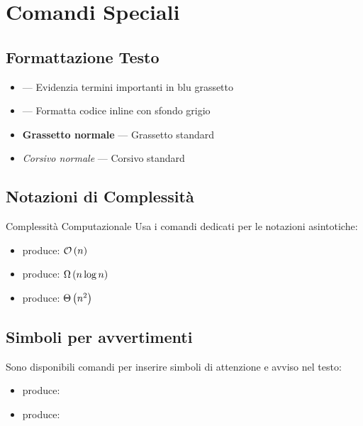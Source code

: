 \documentclass{csnotes}
\begin{document}

\section{Comandi Speciali}

\subsection{Formattazione Testo}

\begin{itemize}
    \item {} --- Evidenzia termini importanti in blu grassetto
    \item {} --- Formatta codice inline con sfondo grigio
    \item \textbf{Grassetto normale} --- Grassetto standard
    \item \textit{Corsivo normale} --- Corsivo standard
\end{itemize}

\subsection{Notazioni di Complessità}

\begin{example}{Complessità Computazionale}
Usa i comandi dedicati per le notazioni asintotiche:
\begin{itemize}
    \item {} produce: \(\mathcal{O}\left(n\right)\)
    \item {} produce: \(\Omega\left(n \log n\right)\)
    \item {} produce: \(\Theta\left(n^2\right)\)
\end{itemize}
\end{example}

\subsection{Simboli per avvertimenti}

Sono disponibili comandi per inserire simboli di attenzione e avviso nel testo:
\begin{itemize}
    \item {} produce: \warningsymbol
    \item {} produce: \infosymbol
\end{itemize}
\end{document}
